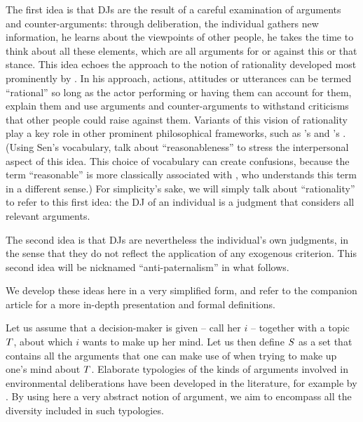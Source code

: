 \documentclass[version=3.21, pagesize, twoside=off, bibliography=totoc, DIV=calc, fontsize=12pt, a4paper, french, english]{scrartcl}
\begin{document}
The first idea is that \acp{DJ} are the result of a careful examination of arguments and counter-arguments: through deliberation, the individual gathers new information, he learns about the viewpoints of other people, he takes the time to think about all these elements, 
which are all arguments for or against this or that stance. 
This idea echoes the approach to the notion of rationality developed most prominently by \citet{habermas_theorie_1981}. 
In his approach, actions, attitudes or utterances can be termed “rational” so long as the actor performing or having them can account for them, explain them and use arguments and counter-arguments to withstand criticisms that other people could raise against them. 
Variants of this vision of rationality play a key role in other prominent philosophical frameworks, such as \citeauthor{scanlon_what_2000}’s \citeyearpar{scanlon_what_2000} and \citeauthor{sen_idea_2009}’s \citeyearpar{sen_idea_2009}. 
(Using Sen's vocabulary, \citeauthor{bartkowski_beyond_2018} talk about ``reasonableness'' to stress the interpersonal aspect of this idea. 
This choice of vocabulary can create confusions, because the term ``reasonable'' is more classically associated with \citet{rawls_political_2005}, who understands this term in a different sense.) 
For simplicity's sake, we will simply talk about ``rationality'' to refer to this first idea: the \ac{DJ} of an individual is a judgment that considers all relevant arguments.

The second idea is that \acp{DJ} are nevertheless the individual's own judgments, in the sense that they do not reflect the application of any exogenous criterion. 
This second idea will be nicknamed ``anti-paternalism'' in what follows. 

We develop these ideas here in a very simplified form, and refer to the companion article \citep{cailloux_formal_2018} for a more in-depth presentation and formal definitions. 

Let us assume that a decision-maker is given -- call her $i$ -- together with a topic $T$, about which $i$ wants to make up her mind. 
Let us then define $S$ as a set that contains all the arguments that one can make use of when trying to make up one’s mind about $T$.
Elaborate typologies of the kinds of arguments involved in environmental deliberations have been developed in the literature, for example by \citet{chateauraynaud_contrainte_2007}. 
By using here a very abstract notion of argument, we aim to encompass all the diversity included in such typologies. 
\end{document}
